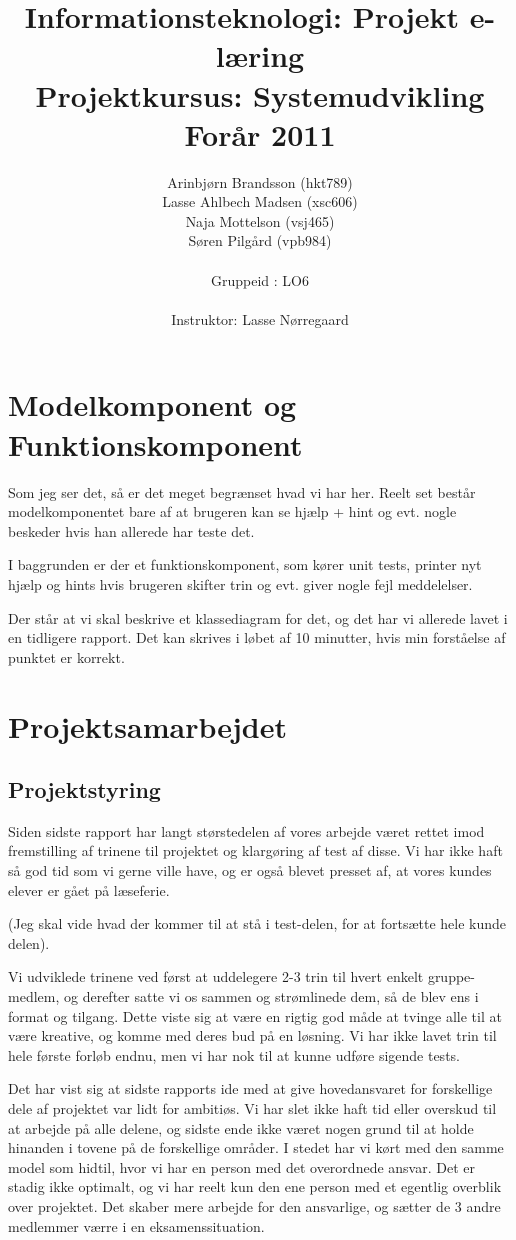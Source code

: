 \documentclass[10pt,a4paper,danish]{article}
\title{Informationsteknologi: Projekt e-læring \\ Projektkursus: Systemudvikling \\Forår 2011}
\author{Arinbjørn Brandsson (hkt789)\\Lasse Ahlbech Madsen (xsc606)\\Naja Mottelson (vsj465)\\Søren Pilgård (vpb984)\\
\\
Gruppeid : LO6\\
\\Instruktor: Lasse Nørregaard}
\begin{document}
\maketitle
\newpage

\tableofcontents
\newpage



\section{Modelkomponent og Funktionskomponent}

Som jeg ser det, så er det meget begrænset hvad vi har her. Reelt set består
modelkomponentet bare af at brugeren kan se hjælp + hint og evt. nogle beskeder
hvis han allerede har teste det. 

I baggrunden er der et funktionskomponent, som kører unit tests, printer nyt
hjælp og hints hvis brugeren skifter trin og evt. giver nogle fejl meddelelser. 

Der står at vi skal beskrive et klassediagram for det, og det har vi allerede
lavet i en tidligere rapport. Det kan skrives i løbet af 10 minutter, hvis min
forståelse af punktet er korrekt. 

\section{Projektsamarbejdet}
\subsection{Projektstyring}
Siden sidste rapport har langt størstedelen af vores arbejde været rettet imod
fremstilling af trinene til projektet og klargøring af test af disse. Vi har
ikke haft så god tid som vi gerne ville have, og er også blevet presset af, at
vores kundes elever er gået på læseferie. 

(Jeg skal vide hvad der kommer til at stå i test-delen, for at fortsætte hele kunde delen).

Vi udviklede trinene ved først at uddelegere 2-3 trin til hvert enkelt gruppe-
medlem, og derefter satte vi os sammen og strømlinede dem, så de blev ens i
format og tilgang. Dette viste sig at være en rigtig god måde at tvinge alle
til at være kreative, og komme med deres bud på en løsning. Vi har ikke lavet
trin til hele første forløb endnu, men vi har nok til at kunne udføre sigende
tests.

Det har vist sig at sidste rapports ide med at give hovedansvaret for
forskellige dele af projektet var lidt for ambitiøs. Vi har slet ikke haft tid
eller overskud til at arbejde på alle delene, og sidste ende ikke været nogen
grund til at holde hinanden i tovene på de forskellige områder. I stedet har vi
kørt med den samme model som hidtil, hvor vi har en person med det overordnede
ansvar. Det er stadig ikke optimalt, og vi har reelt kun den ene person med et
egentlig overblik over projektet. Det skaber mere arbejde for den ansvarlige,
og sætter de 3 andre medlemmer værre i en eksamenssituation.
\end{document}
